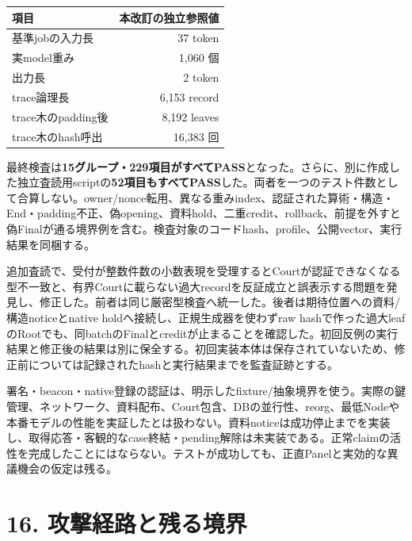\documentclass[
  10pt,
]{article}
\begin{document}
\begin{longtable}[]{@{}lr@{}}
\toprule\noalign{}
項目 & 本改訂の独立参照値 \\
\midrule\noalign{}
\endhead
\bottomrule\noalign{}
\endlastfoot
基準jobの入力長 & 37 token \\
実model重み & 1,060 個 \\
出力長 & 2 token \\
trace論理長 & 6,153 record \\
trace木のpadding後 & 8,192 leaves \\
trace木のhash呼出 & 16,383 回 \\
\end{longtable}

最終検査は\textbf{15グループ・229項目がすべてPASS}となった。さらに、別に作成した独立査読用scriptの\textbf{52項目もすべてPASS}した。両者を一つのテスト件数として合算しない。owner/nonce転用、異なる重みindex、認証された算術・構造・End・padding不正、偽opening、資料hold、二重credit、rollback、前提を外すと偽Finalが通る境界例を含む。検査対象のコードhash、profile、公開vector、実行結果を同梱する。

追加査読で、受付が整数件数の小数表現を受理するとCourtが認証できなくなる型不一致と、有界Courtに載らない過大recordを反証成立と誤表示する問題を発見し、修正した。前者は同じ厳密型検査へ統一した。後者は期待位置への資料/構造noticeとnative
holdへ接続し、正規生成器を使わずraw
hashで作った過大leafのRootでも、同batchのFinalとcreditが止まることを確認した。初回反例の実行結果と修正後の結果は別に保全する。初回実装本体は保存されていないため、修正前については記録されたhashと実行結果までを監査証跡とする。

署名・beacon・native登録の認証は、明示したfixture/抽象境界を使う。実際の鍵管理、ネットワーク、資料配布、Court包含、DBの並行性、reorg、最低Nodeや本番モデルの性能を実証したとは扱わない。資料noticeは成功停止までを実装し、取得応答・客観的なcase終結・pending解除は未実装である。正常claimの活性を完成したことにはならない。テストが成功しても、正直Panelと実効的な異議機会の仮定は残る。

\section{16.
攻撃経路と残る境界}\label{ux653bux6483ux7d4cux8defux3068ux6b8bux308bux5883ux754c}
\end{document}

